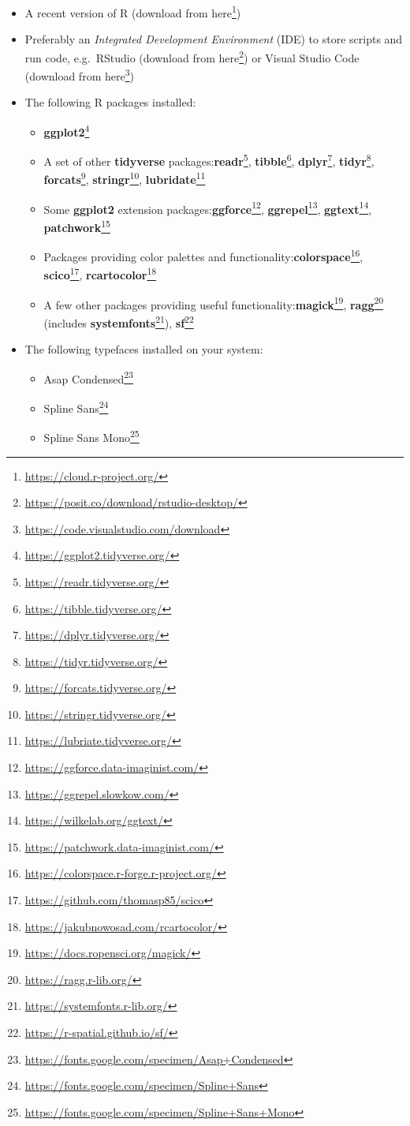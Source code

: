 \documentclass[
]{krantz}
\providecommand{\tightlist}{%
  \setlength{\itemsep}{0pt}\setlength{\parskip}{0pt}}
\renewcommand{\href}[2]{#2\footnote{\url{#1}}}
\begin{document}
\begin{itemize}
\item
  A recent version of R (download from \href{https://cloud.r-project.org/}{here})
\item
  Preferably an \emph{Integrated Development Environment} (IDE) to store scripts and run code, e.g.~RStudio (download from \href{https://posit.co/download/rstudio-desktop/}{here}) or Visual Studio Code (download from \href{https://code.visualstudio.com/download}{here})
\item
  The following R packages installed:

  \begin{itemize}
  \tightlist
  \item
    \href{https://ggplot2.tidyverse.org/}{\textbf{ggplot2}}
  \item
    A set of other \textbf{tidyverse} packages:\href{https://readr.tidyverse.org/}{\textbf{readr}}, \href{https://tibble.tidyverse.org/}{\textbf{tibble}}, \href{https://dplyr.tidyverse.org/}{\textbf{dplyr}}, \href{https://tidyr.tidyverse.org/}{\textbf{tidyr}}, \href{https://forcats.tidyverse.org/}{\textbf{forcats}}, \href{https://stringr.tidyverse.org/}{\textbf{stringr}}, \href{https://lubriate.tidyverse.org/}{\textbf{lubridate}}
  \item
    Some \textbf{ggplot2} extension packages:\href{https://ggforce.data-imaginist.com/}{\textbf{ggforce}}, \href{https://ggrepel.slowkow.com/}{\textbf{ggrepel}}, \href{https://wilkelab.org/ggtext/}{\textbf{ggtext}}, \href{https://patchwork.data-imaginist.com/}{\textbf{patchwork}}
  \item
    Packages providing color palettes and functionality:\href{https://colorspace.r-forge.r-project.org/}{\textbf{colorspace}}, \href{https://github.com/thomasp85/scico}{\textbf{scico}}, \href{https://jakubnowosad.com/rcartocolor/}{\textbf{rcartocolor}}
  \item
    A few other packages providing useful functionality:\href{https://docs.ropensci.org/magick/}{\textbf{magick}}, \href{https://ragg.r-lib.org/}{\textbf{ragg}} (includes \href{https://systemfonts.r-lib.org/}{\textbf{systemfonts}}), \href{https://r-spatial.github.io/sf/}{\textbf{sf}}
  \end{itemize}
\item
  The following typefaces installed on your system:

  \begin{itemize}
  \tightlist
  \item
    \href{https://fonts.google.com/specimen/Asap+Condensed}{Asap Condensed}
  \item
    \href{https://fonts.google.com/specimen/Spline+Sans}{Spline Sans}
  \item
    \href{https://fonts.google.com/specimen/Spline+Sans+Mono}{Spline Sans Mono}
  \end{itemize}
\end{itemize}
\end{document}
